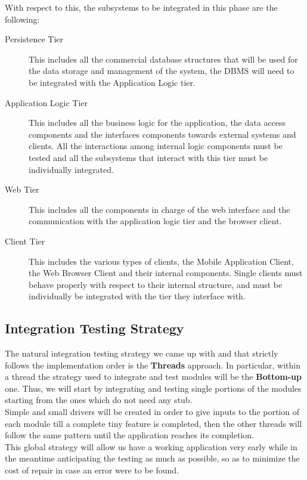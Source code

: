 With respect to this, the subsystems to be integrated in this phase are the following:
\begin{description}
\item[Persistence Tier] This includes all the commercial database structures that will be used for the data storage and management of the system, the DBMS will need to be integrated with the Application Logic tier.
\item[Application Logic Tier] This includes all the business logic for the application, the data access components and the interfaces components towards external systems and clients. All the interactions among internal logic components must be tested and all the subsystems that interact with this tier must be individually integrated.
\item[Web Tier] This includes all the components in charge of the web interface and the communication with the application logic tier and the browser client.
\item[Client Tier] This includes the various types of clients, the Mobile Application Client, the Web Browser Client and their internal components. Single clients must behave properly with respect to their internal structure, and must be individually be integrated with the tier they interface with.
\end{description}

\subsection{Integration Testing Strategy}
The natural integration testing strategy we came up with and that strictly follows the implementation order is the \textbf{Threads} approach. In particular, within a thread the strategy used to integrate and test modules will be the \textbf{Bottom-up} one. Thus, we will start by integrating and testing single portions of the modules starting from the ones which do not need any stub. 
\\Simple and small drivers will be created in order to give inputs to the portion of each module till a complete tiny feature is completed, then the other threads will follow the same pattern until the application reaches its completion.
\\This global strategy will allow us have a working application very early while in the meantime anticipating the testing as much as possible, so as to minimize the cost of repair in case an error were to be found.